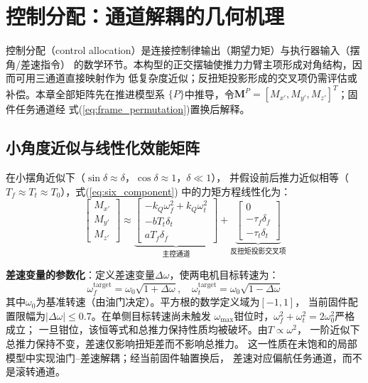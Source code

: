 \section{控制分配：通道解耦的几何机理}
\label{sec:allocation}

控制分配（control allocation）是连接控制律输出（期望力矩）与执行器输入（摆角/差速指令）
的数学环节。本构型的正交摆轴使推力力臂主项形成对角结构，因而可用三通道直接映射作为
低复杂度近似；反扭矩投影形成的交叉项仍需评估或补偿。本章全部矩阵先在推进模型系
$\{P\}$中推导，令$\bm M^P=[M_{x'},M_{y'},M_{z'}]^T$；固件任务通道经
式(\ref{eq:frame_permutation})置换后解释。

\subsection{小角度近似与线性化效能矩阵}

在小摆角近似下（$\sin\delta \approx \delta$，$\cos\delta \approx 1$，$\delta \ll 1$），
并假设前后推力近似相等（$T_f \approx T_t \approx T_0$），式(\ref{eq:six_component})
中的力矩方程线性化为：
\begin{equation}
    \begin{bmatrix} M_{x'} \\ M_{y'} \\ M_{z'} \end{bmatrix}
    \approx
    \underbrace{
    \begin{bmatrix}
        -k_Q \omega_f^2 + k_Q \omega_t^2 \\
        -b T_t \delta_t \\
        a T_f \delta_f
    \end{bmatrix}
    }_{\text{主控通道}}
    +
    \underbrace{
    \begin{bmatrix}
        0 \\
        -\tau_f \delta_f \\
        -\tau_t \delta_t
    \end{bmatrix}
    }_{\text{反扭矩投影交叉项}}
    \label{eq:moment_linearized}
\end{equation}

\textbf{差速变量的参数化}：定义差速变量$\Delta\omega$，使两电机目标转速为：
\begin{equation}
    \omega_f^{\text{target}} = \omega_0 \sqrt{1 + \Delta\omega}, \quad
    \omega_t^{\text{target}} = \omega_0 \sqrt{1 - \Delta\omega}
    \label{eq:diff_def}
\end{equation}
其中$\omega_0$为基准转速（由油门决定）。平方根的数学定义域为$[-1,1]$，
当前固件配置限幅为$|\Delta\omega|\leq0.7$。在单侧目标转速尚未触发
$\omega_{\max}$钳位时，$\omega_f^2+\omega_t^2=2\omega_0^2$严格成立；
一旦钳位，该恒等式和总推力保持性质均被破坏。由$T\propto\omega^2$，
一阶近似下总推力保持不变，差速仅影响扭矩差而不影响总推力。
这一性质在未饱和的局部模型中实现油门--差速解耦；经当前固件轴置换后，
差速对应偏航任务通道，而不是滚转通道。

